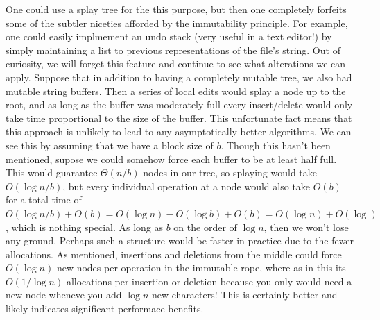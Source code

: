 \documentclass[12pt]{article}
\begin{document}
One could use a splay tree for the this purpose, but then one completely forfeits some of the subtler niceties afforded by the immutability principle. For example, one could easily implmement an undo stack (very useful in a text editor!) by simply maintaining a list to previous representations of the file's string. Out of curiosity, we will forget this feature and continue to see what alterations we can apply. Suppose that in addition to having a completely mutable tree, we also had mutable string buffers. Then a series of local edits would splay a node up to the root, and as long as the buffer was moderately full every insert/delete would only take time proportional to the size of the buffer. This unfortunate fact means that this approach is unlikely to lead to any asymptotically better algorithms. We can see this by assuming that we have a block size of $b$. Though this hasn't been mentioned, supose we could somehow force each buffer to be at least half full. This would guarantee $\Theta(n/b)$ nodes in our tree, so splaying would take $O(\log n/b)$, but every individual operation at a node would also take $O(b)$ for a total time of $O(\log n/b) + O(b) = O(\log n) - O(\log b) + O(b) = O(\log n) + O(\log )$, which is nothing special. As long as $b$ on the order of $\log n$, then we won't lose any ground. Perhaps such a structure would be faster in practice due to the fewer allocations. As mentioned, insertions and deletions from the middle could force $O(\log n)$ new nodes per operation in the immutable rope, where as in this its $O(1 / \log n)$ allocations per insertion or deletion because you only would need a new node wheneve you add $\log n$ new characters! This is certainly better and likely indicates significant performace benefits.
\end{document}
